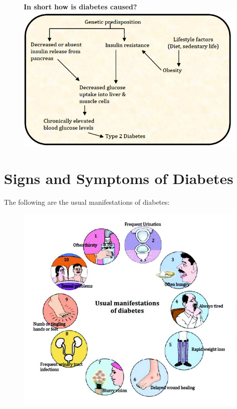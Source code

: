 \textbf{}
\begin{figure}[h]
\centering
\textbf{In short how is diabetes caused?}\\
\includegraphics[scale=2]{images/022.jpg}
\end{figure}


\chapter{Signs and Symptoms of Diabetes}\label{chap4}

The following are the usual manifestations of diabetes:

\begin{figure}[h]
\centering
\includegraphics[scale=1.5]{images/023.jpg}
\end{figure}

